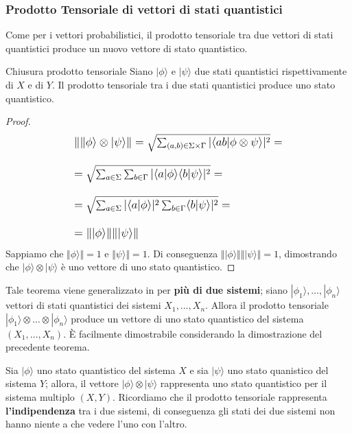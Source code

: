 \subsubsection{Prodotto Tensoriale di vettori di stati quantistici}
Come per i vettori probabilistici, il prodotto tensoriale tra due vettori di stati quantistici produce un nuovo vettore di stato quantistico.
\begin{theorem}{Chiusura prodotto tensoriale}{}
    Siano $|\phi\rangle$ e $|\psi\rangle$ due stati quantistici rispettivamente di $X$ e di $Y$. Il prodotto tensoriale tra i due stati quantistici produce uno stato quantistico.
\end{theorem}
\begin{proof}
\begin{equation*}
\large
\begin{array}{l}

    \Vert \|\phi\rangle \otimes |\psi\rangle \Vert = \sqrt{\sum_{(a,b) \in \Sigma \times \Gamma} |\langle ab|\phi \otimes \psi \rangle|^2} = \\ \\
    = \sqrt{\sum_{a \in \Sigma} \sum_{b \in \Gamma} |\langle a|\phi\rangle \langle b | \psi \rangle|^2} = \\ \\
    = \sqrt{\sum_{a \in \Sigma} |\langle a|\phi\rangle|^2 \sum_{b \in \Gamma} \langle b | \psi \rangle|^2} = \\ \\
    = \Vert |\phi\rangle \Vert \Vert |\psi\rangle \Vert
    
\end{array}
\end{equation*}
Sappiamo che $\Vert \phi \rangle \Vert = 1$ e $\Vert \psi \rangle \Vert = 1$. Di conseguenza $\Vert |\phi\rangle \Vert \Vert |\psi\rangle \Vert = 1$, dimostrando che $|\phi\rangle \otimes |\psi\rangle$ è uno vettore di uno stato quantistico.
\end{proof}
Tale teorema viene generalizzato in per \textbf{più di due sistemi}; siano $|\phi_1\rangle, \hdots, |\phi_n\rangle$ vettori di stati quantistici dei sistemi $X_1, \hdots, X_n$. Allora il prodotto tensoriale $|\phi_1\rangle \otimes \hdots \otimes |\phi_n\rangle$ produce un vettore di uno stato quantistico del sistema $(X_1, \hdots, X_n)$. È facilmente dimostrabile considerando la dimostrazione del precedente teorema.

Sia $|\phi\rangle$ uno stato quantistico del sistema $X$ e sia $|\psi\rangle$ uno stato quanistico del sistema $Y$; allora, il vettore $|\phi\rangle \otimes |\psi\rangle$ rappresenta uno stato quantistico per il sistema multiplo $(X,Y)$. Ricordiamo che il prodotto tensoriale rappresenta \textbf{l'indipendenza} tra i due sistemi, di conseguenza gli stati dei due sistemi non hanno niente a che vedere l'uno con l'altro.

